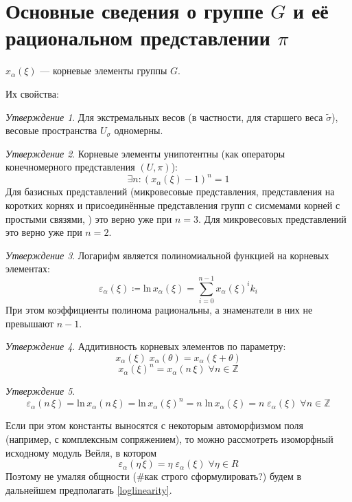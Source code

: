 \documentclass[10pt]{article}
\theoremstyle{remark}
\newtheorem{prop}{Утверждение}
\newcommand{\Z}{\mathbb{Z}}
\begin{document}
\section{Основные сведения о группе $G$ и её рациональном представлении $\pi$}

$x_\alpha(\xi)$ --- корневые элементы группы $G$.

Их свойства:

\begin{prop}
Для экстремальных весов (в частности, для старшего веса $\widetilde\sigma$), весовые пространства $U_\sigma$ одномерны.
\end{prop}

\begin{prop}
Корневые элементы унипотентны (как операторы конечномерного представления $(U,\pi)$):
$$\exists n : (x_\alpha(\xi)-1)^n = 1$$
Для базисных представлений (микровесовые представления, представления на коротких корнях и присоединённые представления групп с сисмемами корней с простыми связями, \cite{Plotkin1998}) это верно уже при $n=3$. Для микровесовых представлений это верно уже при $n=2$.
\end{prop}

\begin{prop}
Логарифм является полиномиальной функцией на корневых элементах:
$$ \varepsilon_\alpha(\xi) \coloneqq \mathrm{ln} \, x_\alpha(\xi) = \sum_{i=0}^{n-1} {x_\alpha(\xi)^i k_i} $$
При этом коэффициенты полинома рациональны, а знаменатели в них не превышают $n-1$.
\end{prop}

\begin{prop} Аддитивность корневых элементов по параметру:
$$x_\alpha(\xi) \; x_\alpha(\theta)  = x_\alpha(\xi+\theta)$$
$$x_\alpha(\xi)^n = x_\alpha(n \, \xi) \; \forall n \in \Z$$
\end{prop}

\begin{prop}
$$ \varepsilon_\alpha(n \, \xi) = \mathrm{ln} \, x_\alpha(n \, \xi) = \mathrm{ln} \, x_\alpha(\xi)^n = n \; \mathrm{ln} \, x_\alpha(\xi) = n \; \varepsilon_\alpha(\xi) \; \forall n \in \Z
$$
\end{prop}

Если при этом константы выносятся с некоторым автоморфизмом поля (например, с комплексным сопряжением), то можно рассмотреть изоморфный исходному модуль Вейля, в котором
\begin{equation} \label{loglinearity}
\varepsilon_\alpha(\eta \, \xi) = \eta \; \varepsilon_\alpha(\xi) \; \forall \eta \in R
\end{equation}
Поэтому не умаляя общности (\#как строго сформулировать?) будем в дальнейшем предполагать \ref{loglinearity}.
\end{document}
